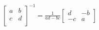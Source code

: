 \documentclass[preview]{standalone}
\begin{document}
\begin{align*}
\begin{bmatrix}  a & b\\  c & d\\\end{bmatrix}^{-1} =\frac {1} {ad- bc}\begin{bmatrix}d & -b \\-c & a\end{bmatrix}
\end{align*}
\end{document}

